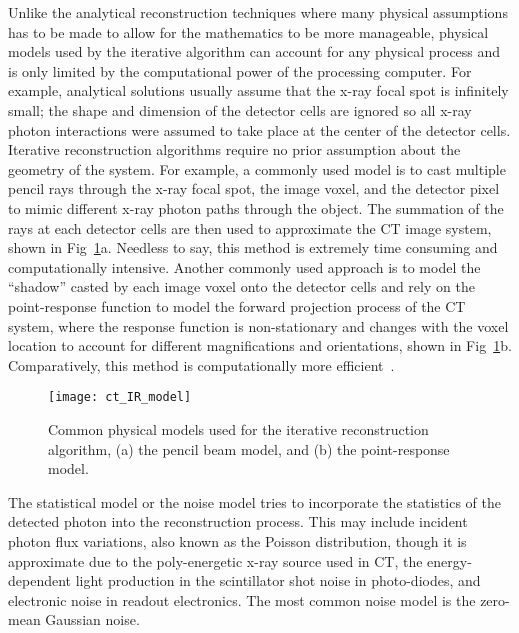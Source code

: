 Unlike the analytical reconstruction techniques where many physical assumptions has to be made to allow for the mathematics to be more manageable, physical models used by the iterative algorithm can account for any physical process and is only limited by the computational power of the processing computer.  For example, analytical solutions usually assume that the x-ray focal spot is infinitely small; the shape and dimension of the detector cells are ignored so all x-ray photon interactions were assumed to take place at the center of the detector cells.  Iterative reconstruction algorithms require no prior assumption about the geometry of the system.  For example, a commonly used model is to cast multiple pencil rays through the x-ray focal spot, the image voxel, and the detector pixel to mimic different x-ray photon paths through the object.  The summation of the rays at each detector cells are then used to approximate the CT image system, shown in Fig~\ref{fig:physical_modeling}a. Needless to say, this method is extremely time consuming and computationally intensive.  Another commonly used approach is to model the ``shadow'' casted by each image voxel onto the detector cells and rely on the point-response function to model the forward projection process of the CT system, where the response function is non-stationary and changes with the voxel location to account for different magnifications and orientations, shown in Fig~\ref{fig:physical_modeling}b.  Comparatively, this method is computationally more efficient~\citep{Hsieh2013}.

\begin{figure}
\texttt{[image: ct\_IR\_model]}
\caption{Common physical models used for the iterative reconstruction algorithm, (a) the pencil beam model, and (b) the point-response model.}
\label{fig:physical_modeling}
\end{figure}

The statistical model or the noise model tries to incorporate the statistics of the detected photon into the reconstruction process.  This may include incident photon flux variations, also known as the Poisson distribution, though it is approximate due to the poly-energetic x-ray source used in CT, the energy-dependent light production in the scintillator shot noise in photo-diodes, and electronic noise in readout electronics. The most common noise model is the zero-mean Gaussian noise.

